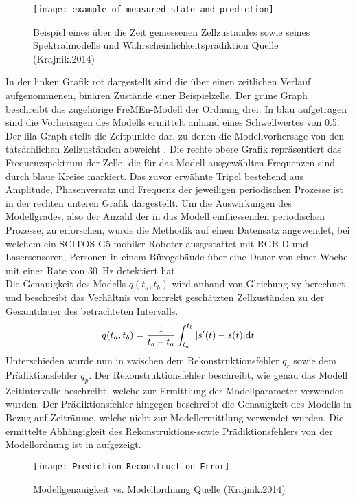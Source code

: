 \begin{figure}[!ht]
	\begin{center}
		\texttt{[image: example\_of\_measured\_state\_and\_prediction]}
		\caption{Beispiel eines über die Zeit gemessenen Zellzustandes sowie seines Spektralmodells und Wahrscheinlichkeitsprädiktion Quelle (Krajnik.2014)}
		\label{fig.FreMEn Beispiel}
	\end{center}
\end{figure}
In der linken Grafik rot dargestellt sind die über einen zeitlichen Verlauf aufgenommenen, binären Zustände einer Beispielzelle. Der grüne Graph beschreibt das zugehörige FreMEn-Modell der Ordnung drei. In blau aufgetragen sind die Vorhersagen des Modells ermittelt anhand eines Schwellwertes von 0.5. Der lila Graph stellt die Zeitpunkte dar, zu denen die Modellvorhersage von den tatsächlichen Zellzuständen abweicht \cite{Krajnik.2014}. Die rechte obere Grafik repräsentiert das Frequenzspektrum der Zelle, die für das Modell ausgewählten Frequenzen sind durch blaue Kreise markiert. Das zuvor erwähnte Tripel bestehend aus Amplitude, Phasenversatz und Frequenz der jeweiligen periodischen Prozesse ist in der rechten unteren Grafik dargestellt. Um die Auswirkungen des Modellgrades, also der Anzahl der in das Modell einfliessenden periodischen Prozesse, zu erforschen, wurde die Methodik auf einen Datensatz angewendet, bei welchem ein SCITOS-G5 mobiler Roboter ausgestattet mit RGB-D und Lasersensoren, Personen in einem Bürogebäude über eine Dauer von einer Woche mit einer Rate von \SI{30}{\hertz} detektiert hat. \\
Die Genauigkeit des Modells $q(t_a,t_b)$ wird anhand von Gleichung xy berechnet und beschreibt das Verhältnis von korrekt geschätzten Zellzuständen zu der Gesamtdauer des betrachteten Intervalls.
\begin{equation}
	q(t_a,t_b) = \frac{1}{t_b - t_a} \int_{t_a}^{t_b} |s'(t) - s(t)| {\mathrm{d}}t
	\label{eq:Modellgenauigkeit}
\end{equation}
Unterschieden wurde nun in \cite{Krajnik.2014} zwischen dem Rekonstruktionsfehler $q_r$ sowie dem Prädiktionsfehler $q_p$. Der Rekonstruktionsfehler beschreibt, wie genau das Modell Zeitintervalle beschreibt, welche zur Ermittlung der Modellparameter verwendet wurden. Der Prädiktionsfehler hingegen beschreibt die Genauigkeit des Modells in Bezug auf Zeiträume, welche nicht zur Modellermittlung verwendet wurden. Die ermittelte Abhängigkeit des Rekonstruktions-sowie Prädiktionsfehlers von der Modellordnung ist in  aufgezeigt. \\
\begin{figure}[!ht]
	\begin{center}
		\texttt{[image: Prediction\_Reconstruction\_Error]}
		\caption{Modellgenauigkeit vs. Modellordnung Quelle (Krajnik.2014)}
		\label{fig.Modellgenauigkeit}
	\end{center}
	
\end{figure}

